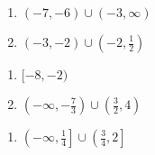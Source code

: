 \begin{multicols}{2}
\begin{enumerate}	\setcounter{enumi}{\value{Review}}
    \item $(-7, -6) \cup (-3, \infty)$
    \item $(-3,-2) \cup \left(-2, \frac{1}{2}\right)$
\end{enumerate}	\setcounter{Review}{\value{enumi}}
\end{multicols}
\begin{multicols}{2}
\begin{enumerate}	\setcounter{enumi}{\value{Review}}
    \item $[-8, -2)$
    \item $\left(-\infty, -\frac{7}{3}\right) \cup \left(\frac{3}{2}, 4\right)$ 
\end{enumerate}	\setcounter{Review}{\value{enumi}}
\end{multicols}
\begin{multicols}{2}
\begin{enumerate}	\setcounter{enumi}{\value{Review}}
    \item $\left(-\infty, \frac{1}{4}\right] \cup \left(\frac{3}{4}, 2\right]$
\end{enumerate}	\setcounter{Review}{\value{enumi}}
\end{multicols}